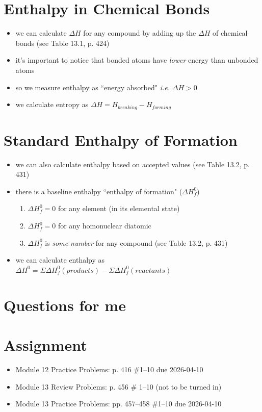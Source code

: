 \documentclass[10pt, oneside]{article}   	%
\begin{document}
\section*{Enthalpy in Chemical Bonds}
\begin{itemize}
\item we can calculate $\Delta H$ for any compound by adding up the $\Delta H$ of chemical bonds (see Table 13.1, p. 424)
\item it's important to notice that bonded atoms have \emph{lower} energy than unbonded atoms
\item so we measure enthalpy as ``energy absorbed" \emph{i.e.} $\Delta H > 0$
\item we calculate entropy as $\Delta H = H_{breaking} - H_{forming}$
\end{itemize}

\section*{Standard Enthalpy of Formation}
\begin{itemize}
\item we can also calculate enthalpy based on accepted values (see Table 13.2, p. 431)
\item there is a baseline enthalpy ``enthalpy of formation" ($\Delta H_{f}^{0}$)
\begin{enumerate}
\item $\Delta H_{f}^{0} = 0$ for any element (in its elemental state)
\item $\Delta H_{f}^{0} = 0$ for any homonuclear diatomic
\item $\Delta H_{f}^{0} $ is \emph{some number} for any compound (see Table 13.2, p. 431)
\end{enumerate}
\item we can calculate enthalpy as $\Delta H^{0} = \Sigma \Delta H_{f} ^{0} (products) - \Sigma \Delta H_{f} ^{0} (reactants)$ 
\end{itemize}


\section*{Questions for me}

\section*{Assignment}
\begin{itemize}
\item Module 12 Practice Problems: p. 416 \#1--10 due 2026-04-10
\item Module 13 Review Problems: p. 456 \# 1--10 (not to be turned in)
\item Module 13 Practice Problems: pp. 457--458 \#1--10 due 2026-04-10
\end{itemize}
\end{document}
